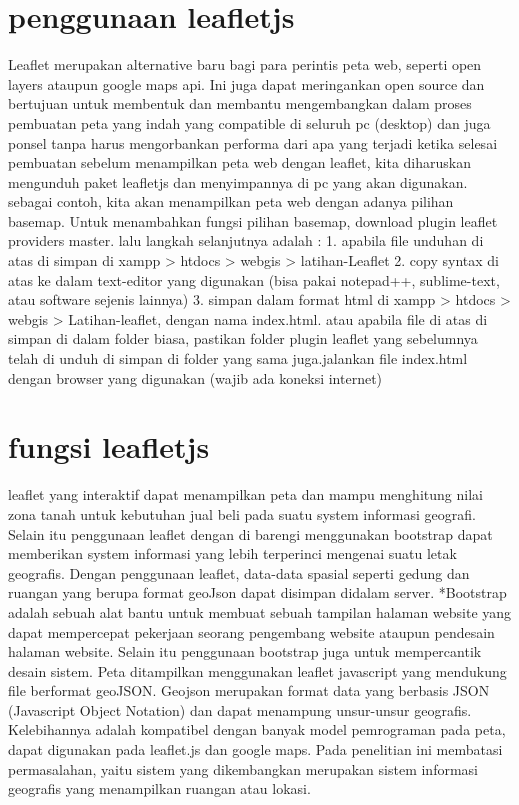 \section{penggunaan leafletjs}
Leaflet merupakan alternative baru bagi para perintis peta web, seperti open layers ataupun google maps api. Ini juga dapat meringankan open source dan bertujuan untuk membentuk dan membantu mengembangkan dalam proses pembuatan peta yang indah yang compatible di seluruh pc (desktop) dan juga ponsel tanpa harus mengorbankan performa dari apa yang terjadi ketika selesai pembuatan
sebelum menampilkan peta web dengan leaflet, kita diharuskan mengunduh paket leafletjs dan menyimpannya di pc yang akan digunakan. 
sebagai contoh, kita akan menampilkan peta web dengan adanya pilihan basemap. Untuk menambahkan fungsi pilihan basemap, download plugin leaflet providers master. lalu langkah selanjutnya adalah :
1. apabila file unduhan di atas di simpan di xampp > htdocs > webgis > latihan-Leaflet
2. copy syntax di atas ke dalam text-editor yang digunakan (bisa pakai notepad++, sublime-text, atau software sejenis lainnya)
3. simpan dalam format html di xampp > htdocs > webgis > Latihan-leaflet, dengan nama index.html. atau apabila file di atas di simpan di      dalam folder biasa, pastikan folder plugin leaflet yang sebelumnya telah di unduh di simpan di folder yang sama juga.jalankan file          index.html dengan browser yang digunakan (wajib ada koneksi internet)

\section{fungsi leafletjs}
leaflet yang interaktif dapat menampilkan peta dan mampu menghitung nilai zona tanah untuk kebutuhan jual beli pada suatu system informasi geografi. Selain itu penggunaan leaflet dengan di barengi menggunakan bootstrap dapat memberikan system informasi yang lebih terperinci mengenai suatu letak geografis. Dengan penggunaan leaflet, data-data spasial seperti gedung dan ruangan yang berupa format geoJson dapat disimpan didalam server. 
*Bootstrap adalah sebuah alat bantu untuk membuat sebuah tampilan halaman  website yang dapat mempercepat pekerjaan seorang pengembang website ataupun pendesain halaman website. Selain itu penggunaan bootstrap juga untuk mempercantik desain sistem. Peta ditampilkan menggunakan leaflet javascript yang mendukung file berformat geoJSON. Geojson merupakan format data yang berbasis JSON (Javascript Object Notation) dan dapat menampung unsur-unsur geografis. Kelebihannya adalah kompatibel dengan banyak model pemrograman pada peta, dapat digunakan pada leaflet.js dan google maps. Pada penelitian ini membatasi permasalahan, yaitu sistem yang dikembangkan merupakan sistem informasi geografis yang menampilkan ruangan atau lokasi.

